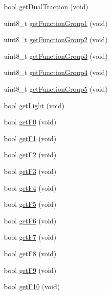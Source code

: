 \begin{DoxyCompactItemize}
\item 
bool \hyperlink{classIoTT_1_1LocDecoder_aff48ce460f2fdf72d5195c66011eeb70}{get\+Dual\+Traction} (void)
\item 
uint8\+\_\+t \hyperlink{classIoTT_1_1LocDecoder_a464c4494c9303bb2ff677244420e83cd}{get\+Function\+Group1} (void)
\item 
uint8\+\_\+t \hyperlink{classIoTT_1_1LocDecoder_a0c36bdf38cbf54119734daa01fdb2798}{get\+Function\+Group2} (void)
\item 
uint8\+\_\+t \hyperlink{classIoTT_1_1LocDecoder_ae4bf79e7de9800aaadc27358a894f73e}{get\+Function\+Group3} (void)
\item 
uint8\+\_\+t \hyperlink{classIoTT_1_1LocDecoder_a89ee10010db132f54576c644a62cb680}{get\+Function\+Group4} (void)
\item 
uint8\+\_\+t \hyperlink{classIoTT_1_1LocDecoder_a1bd40f11b3af2beac3804cd3eb731aae}{get\+Function\+Group5} (void)
\item 
bool \hyperlink{classIoTT_1_1LocDecoder_ad52b8f416735e9a3e77e29b99272e008}{get\+Light} (void)
\item 
bool \hyperlink{classIoTT_1_1LocDecoder_a4d8f4d42c97779e31d2554231b49bb1c}{get\+F0} (void)
\item 
bool \hyperlink{classIoTT_1_1LocDecoder_a6b69fb74cf9c70e1d33dca842bfdcb30}{get\+F1} (void)
\item 
bool \hyperlink{classIoTT_1_1LocDecoder_a69e3524048a03a38a05b1ad6a91ca96a}{get\+F2} (void)
\item 
bool \hyperlink{classIoTT_1_1LocDecoder_a427d64ad3dd1d0a447ba3cb14fa72179}{get\+F3} (void)
\item 
bool \hyperlink{classIoTT_1_1LocDecoder_a8b547231e4897eb9301e1a9a0fe38b51}{get\+F4} (void)
\item 
bool \hyperlink{classIoTT_1_1LocDecoder_a4cf08edc95df77d463422a440b46abba}{get\+F5} (void)
\item 
bool \hyperlink{classIoTT_1_1LocDecoder_a324cc6b43bd971a49b49ff5b0ec2e2fd}{get\+F6} (void)
\item 
bool \hyperlink{classIoTT_1_1LocDecoder_ac312036e9b99e3de3109bbb37a466e57}{get\+F7} (void)
\item 
bool \hyperlink{classIoTT_1_1LocDecoder_a5b6b29371cfa8510e3edbdda9a3340ab}{get\+F8} (void)
\item 
bool \hyperlink{classIoTT_1_1LocDecoder_a0f95eee8ea7fe95d97361f38e1f729cc}{get\+F9} (void)
\item 
bool \hyperlink{classIoTT_1_1LocDecoder_aaccaec37d4f620ceee54868379800eb5}{get\+F10} (void)

\end{DoxyCompactItemize}

